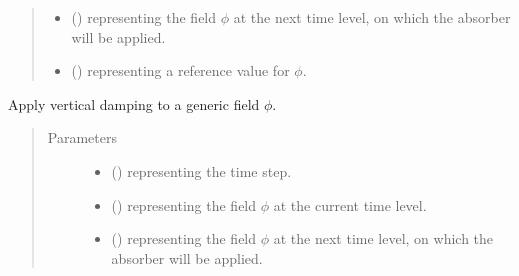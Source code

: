 \documentclass[letterpaper,10pt,english]{sphinxmanual}
\begin{document}
\begin{fulllineitems}
\begin{fulllineitems}
\begin{quote}
\begin{description}
\begin{itemize}
\item {} 
 () \textendash{}  representing the field \(\phi\) at the next time level, on
which the absorber will be applied.

\item {} 
 () \textendash{}  representing a reference value for \(\phi\).

\end{itemize}

\end{description}\end{quote}

\end{fulllineitems}


\begin{fulllineitems}
\label{\detokenize{api:tasmania.dycore.vertical_damping.VerticalDampingRayleigh.apply}}
Apply vertical damping to a generic field \(\phi\).
\begin{quote}\begin{description}
\item[{Parameters}] \leavevmode\begin{itemize}
\item {} 
 () \textendash{}  representing the time step.

\item {} 
 () \textendash{}  representing the field \(\phi\) at the current time level.

\item {} 
 () \textendash{}  representing the field \(\phi\) at the next time level, on
which the absorber will be applied.


\end{itemize}
\end{description}
\end{quote}
\end{fulllineitems}
\end{fulllineitems}
\end{document}
